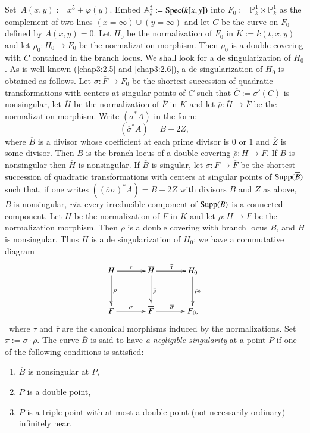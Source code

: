 \subsection{}\label{chap3:3.3}
Set\pageoriginale\ $A(x,y):=x^{5}+\varphi(y)$. Embed
$\mathbb{A}^{2}_{k}:=\operatorname{Spec}(k[x,y])$ into
$F_{0}:=\mathbb{P}^{1}_{k}\times\mathbb{P}^{1}_{k}$ as the complement
of two lines $(x=\infty)\cup (y=\infty)$ and let $C$ be the curve on
$F_{0}$ defined by $A(x,y)=0$. Let $H_{0}$ be the normalization of
$F_{0}$ in $K:=k(t,x,y)$ and let $\rho_{0}:H_{0}\to F_{0}$ be the
normalization morphism. Then $\rho_{0}$ is a double covering with $C$
contained in the branch locus. We shall look for a de singularization
of $H_{0}$. As is well-known (\cf \ref{chap3:2.5} and \ref{chap3:2.6}), a
de singularization of $H_{0}$ is obtained as follows. Let
$\overline{\sigma}:\overline{F}\to F_{0}$ be the shortest succession
of quadratic transformations with centers at singular points of $C$
such that $\overline{C}:=\overline{\sigma}'(C)$ is nonsingular, let
$\overline{H}$ be the normalization of $\overline{F}$ in $K$ and let
$\overline{\rho}:\overline{H}\to \overline{F}$ be the normalization
morphism. Write $(\overline{\sigma}^{\ast}A)$ in the form:
$$
(\overline{\sigma}^{\ast}A)=\overline{B}-2\overline{Z},
$$
where $\overline{B}$ is a divisor whose coefficient at each prime
divisor is $0$ or $1$ and $\overline{Z}$ is some divisor. Then
$\overline{B}$ is the branch locus of a double covering
$\overline{\rho}:\overline{H}\to \overline{F}$. If $\overline{B}$ is
nonsingular then $\overline{H}$ is nonsingular. If $\overline{B}$ is
singular, let $\sigma:F\to \overline{F}$ be the shortest succession of
quadratic transformations with centers at singular points of
$\operatorname{Supp}(\overline{B})$ such that, if one writes
$((\overline{\sigma}\sigma)^{\ast}A)=B-2Z$ with divisors $B$ and $Z$
as above, $B$ is nonsingular, {\em viz.\@} every irreducible component
of $\operatorname{Supp}(B)$ is a connected component. Let $H$ be the normalization
of $F$ in $K$ and let $\rho:H\to F$ be the normalization
morphism. Then $\rho$ is a double covering with branch locus $B$, and
$H$ is nonsingular. Thus $H$ is a de singularization of $H_{0}$; we
have a commutative diagram 
\[
\xymatrix@R=1.1cm@C=1.2cm{
H\ar[d]^{\rho}\ar[r]^{\tau} &
\overline{H}\ar[d]^{\overline{\rho}}\ar[r]^{\overline{\tau}} &
H_{0}\ar[d]^{\rho_{0}}\\
F\ar[r]^{\sigma} & \overline{F}\ar[r]^{\overline{\sigma}} & F_{0},
}
\]\pageoriginale\
where $\tau$ and $\overline{\tau}$ are the canonical morphisms induced
by the normalizations. Set $\pi:=\sigma\cdot\rho$. The curve
$\overline{B}$ is said to have {\em a negligible singularity} at a
point $P$ if one of the following conditions is satisfied:
\begin{enumerate}
\renewcommand{\labelenumi}{(\theenumi)}
\item $\overline{B}$ is nonsingular at $P$,

\item $P$ is a double point,

\item $P$ is a triple point with at most a double point (not
  necessarily ordinary) infinitely near.
\end{enumerate}

